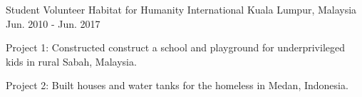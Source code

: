 \vspace{-1ex}

\begin{cventries}

  \cventry
    {Student Volunteer} %
    {Habitat for Humanity International} %
    {Kuala Lumpur, Malaysia} %
    {Jun. 2010 - Jun. 2017} %
    {
      \begin{cvitems} %
        \item {Project 1: Constructed construct a school and playground for underprivileged kids in rural Sabah, Malaysia.}
        \item {Project 2: Built houses and water tanks for the homeless in Medan, Indonesia.}
      \end{cvitems}
    }


\end{cventries}
